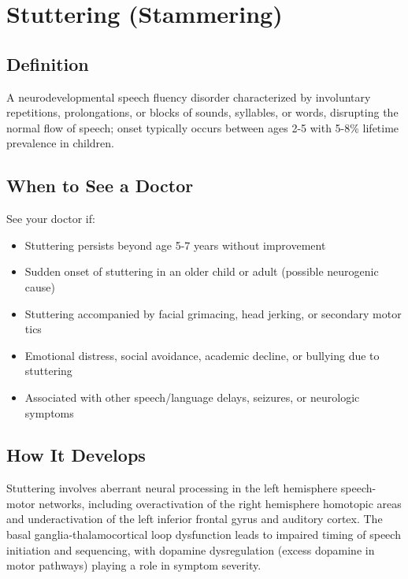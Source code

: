 \chapter{Stuttering (Stammering)}

\section*{Definition}
A neurodevelopmental speech fluency disorder characterized by involuntary repetitions, prolongations, or blocks of sounds, syllables, or words, disrupting the normal flow of speech; onset typically occurs between ages 2-5 with 5-8\% lifetime prevalence in children.

\section*{When to See a Doctor}
See your doctor if:
\begin{itemize}
  \item Stuttering persists beyond age 5-7 years without improvement
  \item Sudden onset of stuttering in an older child or adult (possible neurogenic cause)
  \item Stuttering accompanied by facial grimacing, head jerking, or secondary motor tics
  \item Emotional distress, social avoidance, academic decline, or bullying due to stuttering
  \item Associated with other speech/language delays, seizures, or neurologic symptoms
\end{itemize}

\section*{How It Develops}
Stuttering involves aberrant neural processing in the left hemisphere speech-motor networks, including overactivation of the right hemisphere homotopic areas and underactivation of the left inferior frontal gyrus and auditory cortex. The basal ganglia-thalamocortical loop dysfunction leads to impaired timing of speech initiation and sequencing, with dopamine dysregulation (excess dopamine in motor pathways) playing a role in symptom severity.

